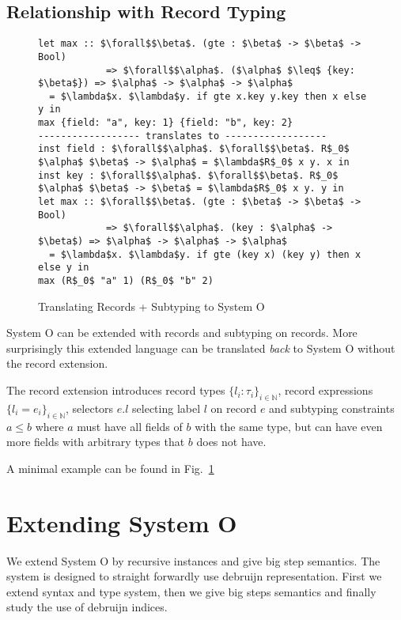 \documentclass[runningheads]{llncs}
\begin{document}
\subsection{Relationship with Record Typing}
\begin{figure}
  \begin{lstlisting}
let max :: $\forall$$\beta$. (gte : $\beta$ -> $\beta$ -> Bool) 
            => $\forall$$\alpha$. ($\alpha$ $\leq$ {key: $\beta$}) => $\alpha$ -> $\alpha$ -> $\alpha$      
  = $\lambda$x. $\lambda$y. if gte x.key y.key then x else y in
max {field: "a", key: 1} {field: "b", key: 2}
------------------ translates to ------------------
inst field : $\forall$$\alpha$. $\forall$$\beta$. R$_0$ $\alpha$ $\beta$ -> $\alpha$ = $\lambda$R$_0$ x y. x in
inst key : $\forall$$\alpha$. $\forall$$\beta$. R$_0$ $\alpha$ $\beta$ -> $\beta$ = $\lambda$R$_0$ x y. y in
let max :: $\forall$$\beta$. (gte : $\beta$ -> $\beta$ -> Bool) 
            => $\forall$$\alpha$. (key : $\alpha$ -> $\beta$) => $\alpha$ -> $\alpha$ -> $\alpha$
  = $\lambda$x. $\lambda$y. if gte (key x) (key y) then x else y in
max (R$_0$ "a" 1) (R$_0$ "b" 2)  
  \end{lstlisting}
  \caption{Translating Records + Subtyping to System O} \label{translate}
\end{figure}
System O can be extended with records and subtyping on records. More surprisingly this extended language can be translated \emph{back} to System O without the record extension.

The record extension introduces record types $\{l_i : \tau_i\}_{i \in \mathbb{N}}$, record expressions $\{l_i = e_i \}_{i \in \mathbb{N}}$, selectors $e.l$ selecting label $l$ on record $e$ and subtyping constraints $a \leq b$ where $a$ must have all fields of $b$ with the same type, but can have even more fields with arbitrary types that $b$ does not have.


A minimal example can be found in Fig.~\ref{translate}
\section{Extending System O}
We extend System O by recursive instances and give big step semantics. The system is designed to straight forwardly use debruijn representation. First we extend syntax and type system, then we give big steps semantics and finally study the use of debruijn indices. 
\end{document}
